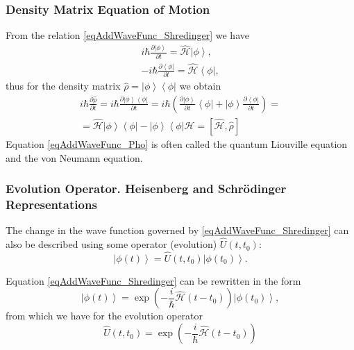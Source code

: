 \subsubsection{Density Matrix Equation of Motion}
From the relation \eqref{eqAddWaveFunc_Shredinger} we have
\begin{eqnarray}
i \hbar \frac{\partial \left| \phi \right>}{\partial t} = \hat{\mathcal{H}}
\left| \phi \right>,
\nonumber \\
- i \hbar \frac{\partial \left< \phi \right|}{\partial t} = \hat{\mathcal{H}}
\left< \phi \right|,
\nonumber
\end{eqnarray}
thus for the density matrix 
$\hat{\rho} = \left| \phi \right>\left< \phi \right|$ we obtain
\begin{eqnarray}
i \hbar \frac{\partial \hat{\rho} }{\partial t} = 
i \hbar \frac{\partial  \left| \phi \right>\left< \phi \right|
}{\partial t} = 
i \hbar \left( \frac{\partial \left| \phi \right>}{\partial t}\left< \phi
\right| +
\left| \phi \right> \frac{\partial \left< \phi \right|}{\partial t}
\right) =
\nonumber \\
=  \hat{\mathcal{H}} \left| \phi \right>\left< \phi \right| -
\left| \phi \right>\left< \phi \right|\hat{\mathcal{H}} = 
\left[ \hat{\mathcal{H}}, \hat{\rho} \right]
\label{eqAddWaveFunc_Pho}
\end{eqnarray}
Equation \eqref{eqAddWaveFunc_Pho} is often called the quantum Liouville equation and the von Neumann equation.

\subsubsection{Evolution Operator. Heisenberg and Schrödinger Representations}

The change in the wave function governed by \eqref{eqAddWaveFunc_Shredinger} can also be described using some operator (evolution) $\hat{U}\left(t,t_0\right)$:
\begin{equation}
\left| \phi\left(t\right) \right> = 
\hat{U}\left(t,t_0\right)\left| \phi\left(t_0\right) \right>.
\label{eqAddWaveFunc_ShredingerU}
\end{equation}

Equation \eqref{eqAddWaveFunc_Shredinger} can be rewritten in the form
\begin{equation}
\left| \phi\left(t\right) \right> = 
\exp\left( -\frac{i}{\hbar} \hat{\mathcal{H}} \left( t - t_0 \right)  \right)
\left| \phi\left(t_0\right) \right>,
\nonumber
\end{equation}
from which we have for the evolution operator
\begin{equation}
\hat{U}\left(t,t_0\right) = 
\exp\left( -\frac{i}{\hbar} \hat{\mathcal{H}} \left( t - t_0 \right)  \right)
\label{eqAddDiracEvolutionOper}
\end{equation}

